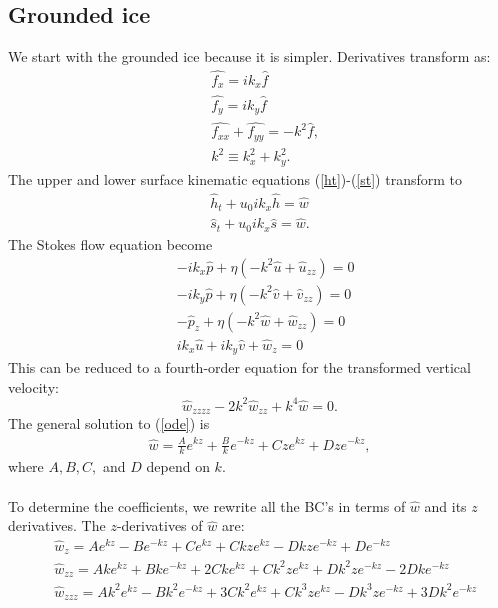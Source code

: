 \documentclass[paper=a4, fontsize=11pt]{article}
\begin{document}
\subsection*{Grounded ice}
We start with the grounded ice because it is simpler.
Derivatives transform as:
\begin{align}
&\widehat{f_x} = ik_x\widehat{f} \\
&\widehat{f_y} = ik_y\widehat{f} \\
&\widehat{f_{xx}} + \widehat{f_{yy}} = -k^2 \widehat{f}, \\ &k^2 \equiv k_x^2 + k_y^2.
\end{align}
The upper and lower surface kinematic equations (\ref{ht})-(\ref{st}) transform to
\begin{align}
\widehat{h}_t + u_0 ik_x \widehat{h} = \widehat{w}\label{hthat}\\
\widehat{s}_t + u_0 ik_x \widehat{s} = \widehat{w}.\label{sthat}
\end{align}
The Stokes flow equation become
\begin{align}
&-ik_x\widehat{p} + \eta ( -k^2\widehat{u} + \widehat{u}_{zz}) = 0 \\
&-ik_y\widehat{p} + \eta ( -k^2\widehat{v} + \widehat{v}_{zz}) = 0 \\
&-\widehat{p}_z + \eta (-k^2\widehat{w} + \widehat{w}_{zz}) = 0 \\
&ik_x\widehat{u} + ik_y\widehat{v} + \widehat{w}_z = 0
\end{align}
This can be reduced to a fourth-order equation for the transformed vertical velocity:
\begin{equation}
\widehat{w}_{zzzz} - 2k^2 \widehat{w}_{zz} + k^4 \widehat{w}=0. \label{ode}
\end{equation}
The general solution to (\ref{ode}) is
\begin{align}
\widehat{w} = \frac{A}{k}e^{k z} + \frac{B}{k}e^{-k z} + {C}ze^{k z}+ {D}ze^{-k z},
\end{align}
where $A,B,C,$ and $D$ depend on $k$.\\ \\
To determine the coefficients, we rewrite all the BC's in terms of $\widehat{w}$ and its $z$ derivatives.
The $z$-derivatives of $\widehat{w}$ are:
\begin{align}
&\widehat{w}_{z} = {A}e^{k z} - {B}e^{-k z} + {C}e^{k z} + {C}kze^{k z} - {D}kze^{-k z} + {D}e^{-k z} \\
&\widehat{w}_{zz} = {Ak}e^{k z} + {Bk}e^{-k z} + {2Ck}e^{k z} + {C}k^2 ze^{k z} + {D}k^2ze^{-k z} - {2Dk}e^{-k z} \\
&\widehat{w}_{zzz} = {Ak^2}e^{k z} - {Bk^2}e^{-k z} + {3Ck^2}e^{k z} + {C}k^3 ze^{k z} - {D}k^3ze^{-k z} + {3Dk^2}e^{-k z}
\end{align}
\end{document}
